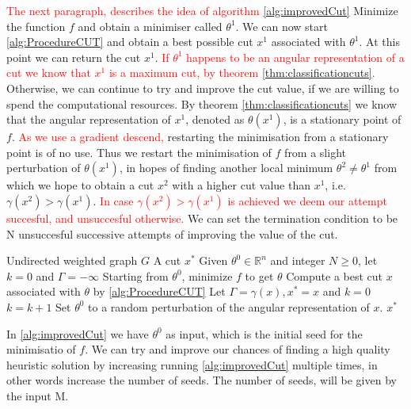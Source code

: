 \documentclass[12pt,a4paper]{article}
\theoremstyle{mythm}
\begin{document}
\textcolor{red}{ The next paragraph, describes the idea of algorithm \ref{alg:improvedCut} }
Minimize the function $ f $ and obtain a minimiser called $ \theta^1 $. 
We can now start \ref{alg:ProcedureCUT} and obtain a best possible cut $ x^1 $ associated with $ \theta^1 $.
At this point we can return the cut $ x^1 $.
\textcolor{red}{If $ \theta^1 $ happens to be an angular representation of a cut we know that $ x^1 $ is a maximum cut, by theorem \ref{thm:classificationcuts}.}
Otherwise, we can continue to try and improve the cut value, if we are willing to spend the computational resources. 
By theorem \ref{thm:classificationcuts} we know that the angular representation of $ x^1 $, denoted as $ \theta ( x^1)  $, is a stationary point of $ f $. 
\textcolor{red}{As we use a gradient descend,} restarting the minimisation from a stationary point is of no use.
Thus we restart the minimisation of $ f $ from a slight perturbation of $ \theta (x^1) $, in hopes of finding another local minimum $ \theta^2 \neq \theta^1  $ from which we
hope to obtain a cut $ x^2 $ with a higher cut value than $ x^1 $, i.e. $ \gamma (x^2) > \gamma (x^1)  $.
\textcolor{red}{ In case $ \gamma (x^2) > \gamma (x^1) $ is achieved we deem our attempt succesful, and unsuccesful otherwise. }
We can set the termination condition to be N unsuccesful successive attempts of improving the value of the cut.
\begin{algorithm}
\caption{\ImprovedCut}
\label{alg:improvedCut} 
\begin{algorithmic}[1]
\Require Undirected weighted graph $ G $
\Ensure A cut $ x^* $
\State Given $ \theta^0 \in \mathbb{R} ^{ n }  $ and integer $ N \geq 0  $, let $ k=0 $ and $ \Gamma = - \infty  $
\State Starting from $ \theta^0 $, minimize $ f $ to get $ \theta  $
\State Compute a best cut $ x $ associated with $ \theta $ by \ref{alg:ProcedureCUT} 
\State Let $ \Gamma = \gamma (x), x^* = x $ and $ k=0 $
\Else
\State $ k = k+1 $
\EndIf
\State Set $ \theta^0 $ to a random perturbation of the angular representation of $ x $.
\EndWhile
\State \Return $ x ^{ * }  $
\EndProcedure
\end{algorithmic}
\end{algorithm}

In \ref{alg:improvedCut} we have $ \theta^0 $ as input, which is the initial seed for the minimisatio of $ f $. We can try and improve our chances of finding a high quality
heuristic solution by increasing running \ref{alg:improvedCut} multiple times, in other words increase the number of seeds. The number of seeds, will be given by the input M.
\end{document}
